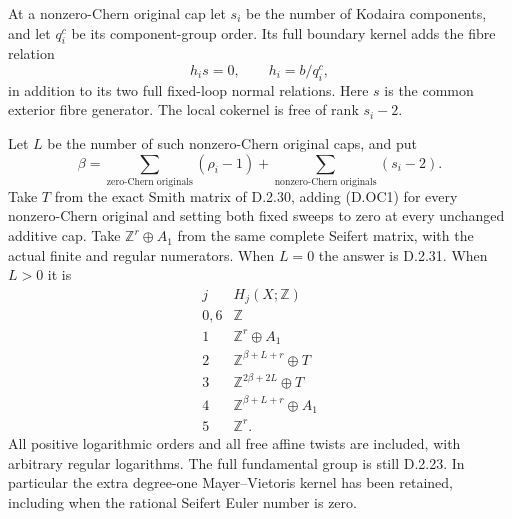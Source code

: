 At a nonzero-Chern original cap let $s_i$ be the number of
Kodaira components, and let $q_i^c$ be its component-group
order. Its full boundary kernel adds the fibre relation
\[
 h_i s=0,\qquad h_i=b/q_i^c,                               \tag{D.OC1}
\]
in addition to its two full fixed-loop normal relations.
Here $s$ is the common exterior fibre generator.
The local cokernel is free of rank $s_i-2$.

Let $L$ be the number of such nonzero-Chern original caps,
and put
\[
 \beta=
 \sum_{\text{zero-Chern originals}}(\rho_i-1)
 +\sum_{\text{nonzero-Chern originals}}(s_i-2).
                                                               \tag{D.OC2}
\]
Take $T$ from the exact Smith matrix of D.2.30, adding
(D.OC1) for every nonzero-Chern original and setting both
fixed sweeps to zero at every unchanged additive cap.
Take $\mathbb Z^r\oplus A_1$ from the same complete Seifert
matrix, with the actual finite and regular numerators.
When $L=0$ the answer is D.2.31. When $L>0$ it is
\[
\begin{array}{c|c}
j&H_j(X;\mathbb Z)\\\hline
0,6&\mathbb Z\\
1&\mathbb Z^r\oplus A_1\\
2&\mathbb Z^{\beta+L+r}\oplus T\\
3&\mathbb Z^{2\beta+2L}\oplus T\\
4&\mathbb Z^{\beta+L+r}\oplus A_1\\
5&\mathbb Z^r.
\end{array}                                                   \tag{D.OC3}
\]
All positive logarithmic orders and all free affine twists
are included, with arbitrary regular logarithms. The full
fundamental group is still D.2.23. In particular the extra
degree-one Mayer--Vietoris kernel has been retained, including
when the rational Seifert Euler number is zero.


